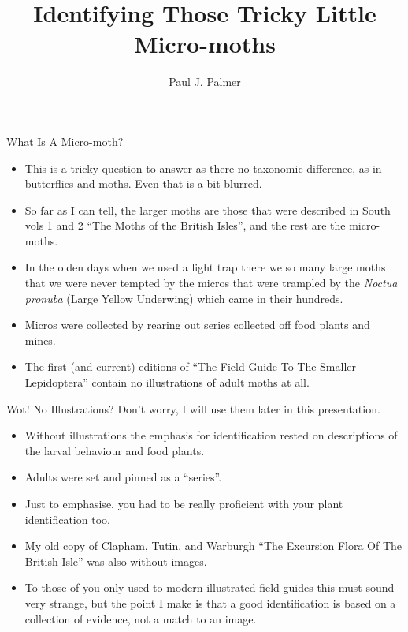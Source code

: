\documentclass[
  ignorenonframetext,
]{beamer}
\title{Identifying Those Tricky Little Micro-moths}
\author{Paul J. Palmer}
\date{}
\providecommand{\tightlist}{%
  \setlength{\itemsep}{0pt}\setlength{\parskip}{0pt}}
\begin{document}
\frame{\titlepage}

\begin{frame}{What Is A Micro-moth?}
\protect\hypertarget{what-is-a-micro-moth}{}
\begin{itemize}
\tightlist
\item
  This is a tricky question to answer as there no taxonomic difference,
  as in butterflies and moths. Even that is a bit blurred.
\item
  So far as I can tell, the larger moths are those that were described
  in South vols 1 and 2 ``The Moths of the British Isles'', and the rest
  are the micro-moths.
\item
  In the olden days when we used a light trap there we so many large
  moths that we were never tempted by the micros that were trampled by
  the \emph{Noctua pronuba} (Large Yellow Underwing) which came in their
  hundreds.
\item
  Micros were collected by rearing out series collected off food plants
  and mines.
\item
  The first (and current) editions of ``The Field Guide To The Smaller
  Lepidoptera'' contain no illustrations of adult moths at all.
\end{itemize}
\end{frame}

\begin{frame}{Wot! No Illustrations?}
\protect\hypertarget{wot-no-illustrations}{}
Don't worry, I will use them later in this presentation.

\begin{itemize}
\tightlist
\item
  Without illustrations the emphasis for identification rested on
  descriptions of the larval behaviour and food plants.
\item
  Adults were set and pinned as a ``series''.
\item
  Just to emphasise, you had to be really proficient with your plant
  identification too.
\item
  My old copy of Clapham, Tutin, and Warburgh ``The Excursion Flora Of
  The British Isle'' was also without images.
\item
  To those of you only used to modern illustrated field guides this must
  sound very strange, but the point I make is that a good identification
  is based on a collection of evidence, not a match to an image.
\end{itemize}
\end{frame}
\end{document}

